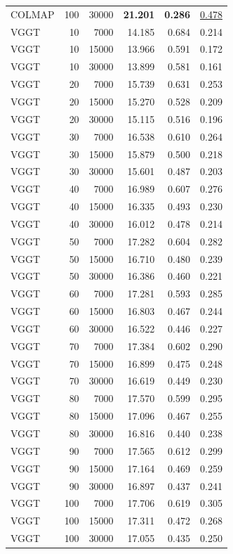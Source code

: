 \begin{table}[H]
\begin{tabular}{lrrrrr}
COLMAP & 100 & 30000 & \textbf{21.201} & \textbf{0.286} & \underline{0.478} \\
VGGT & 10 & 7000 & 14.185 & 0.684 & 0.214 \\
VGGT & 10 & 15000 & 13.966 & 0.591 & 0.172 \\
VGGT & 10 & 30000 & 13.899 & 0.581 & 0.161 \\
VGGT & 20 & 7000 & 15.739 & 0.631 & 0.253 \\
VGGT & 20 & 15000 & 15.270 & 0.528 & 0.209 \\
VGGT & 20 & 30000 & 15.115 & 0.516 & 0.196 \\
VGGT & 30 & 7000 & 16.538 & 0.610 & 0.264 \\
VGGT & 30 & 15000 & 15.879 & 0.500 & 0.218 \\
VGGT & 30 & 30000 & 15.601 & 0.487 & 0.203 \\
VGGT & 40 & 7000 & 16.989 & 0.607 & 0.276 \\
VGGT & 40 & 15000 & 16.335 & 0.493 & 0.230 \\
VGGT & 40 & 30000 & 16.012 & 0.478 & 0.214 \\
VGGT & 50 & 7000 & 17.282 & 0.604 & 0.282 \\
VGGT & 50 & 15000 & 16.710 & 0.480 & 0.239 \\
VGGT & 50 & 30000 & 16.386 & 0.460 & 0.221 \\
VGGT & 60 & 7000 & 17.281 & 0.593 & 0.285 \\
VGGT & 60 & 15000 & 16.803 & 0.467 & 0.244 \\
VGGT & 60 & 30000 & 16.522 & 0.446 & 0.227 \\
VGGT & 70 & 7000 & 17.384 & 0.602 & 0.290 \\
VGGT & 70 & 15000 & 16.899 & 0.475 & 0.248 \\
VGGT & 70 & 30000 & 16.619 & 0.449 & 0.230 \\
VGGT & 80 & 7000 & 17.570 & 0.599 & 0.295 \\
VGGT & 80 & 15000 & 17.096 & 0.467 & 0.255 \\
VGGT & 80 & 30000 & 16.816 & 0.440 & 0.238 \\
VGGT & 90 & 7000 & 17.565 & 0.612 & 0.299 \\
VGGT & 90 & 15000 & 17.164 & 0.469 & 0.259 \\
VGGT & 90 & 30000 & 16.897 & 0.437 & 0.241 \\
VGGT & 100 & 7000 & 17.706 & 0.619 & 0.305 \\
VGGT & 100 & 15000 & 17.311 & 0.472 & 0.268 \\
VGGT & 100 & 30000 & 17.055 & 0.435 & 0.250 \\
\bottomrule
\end{tabular}
\end{table}
